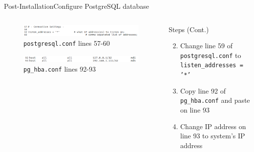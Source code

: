 \documentclass{beamer}
\begin{document}
\begin{frame}{Post-Installation}{Configure PostgreSQL database}
\begin{columns}[T]
\begin{column}{0.5\textwidth}
	\begin{figure}
		\includegraphics[scale=0.2]{figs/postgresqlChange.png}
		\caption{\texttt{postgresql.conf} lines 57-60}
	\end{figure}
	\begin{figure}
		\includegraphics[scale=0.2]{figs/pg_hbaChange.png}
		\caption{\texttt{pg\_hba.conf} lines 92-93}
	\end{figure}
\end{column}
\begin{column}{0.5\textwidth}
	\begin{block}{Steps (Cont.)}
		\begin{enumerate}
			\setcounter{enumi}{1}
			\item Change line 59 of \texttt{postgresql.conf} to \texttt{listen\_addresses = '*'}

			\item Copy line 92 of \texttt{pg\_hba.conf} and paste on line 93
			\item Change IP address on line 93 to system's IP address
		\end{enumerate}
	\end{block}		
\end{column}
\end{columns}
\end{frame}
\end{document}
